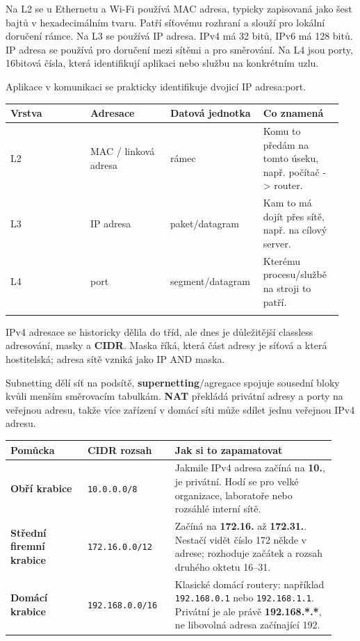 Na L2 se u Ethernetu a Wi-Fi používá MAC adresa, typicky zapisovaná jako šest bajtů v hexadecimálním tvaru. Patří síťovému rozhraní a slouží pro lokální doručení rámce. Na L3 se používá IP adresa. IPv4 má 32 bitů, IPv6 má 128 bitů. IP adresa se používá pro doručení mezi sítěmi a pro směrování. Na L4 jsou porty, 16bitová čísla, která identifikují aplikaci nebo službu na konkrétním uzlu.

Aplikace v komunikaci se prakticky identifikuje dvojicí IP adresa:port.

\begin{longtable}{p{0.237\linewidth}p{0.237\linewidth}p{0.237\linewidth}p{0.237\linewidth}}
\toprule
\textbf{Vrstva} & \textbf{Adresace} & \textbf{Datová jednotka} & \textbf{Co znamená} \\
\midrule\endhead
L2 & MAC / linková adresa & rámec & Komu to předám na tomto úseku, např. počítač -> router. \\
\addlinespace
L3 & IP adresa & paket/datagram & Kam to má dojít přes sítě, např. na cílový server. \\
\addlinespace
L4 & port & segment/datagram & Kterému procesu/službě na stroji to patří. \\
\addlinespace
\bottomrule
\end{longtable}

IPv4 adresace se historicky dělila do tříd, ale dnes je důležitější classless adresování, masky a \textbf{CIDR}. Maska říká, která část adresy je síťová a která hostitelská; adresa sítě vzniká jako IP AND maska.

Subnetting dělí síť na podsítě, \textbf{supernetting}/agregace spojuje sousední bloky kvůli menším směrovacím tabulkám. \textbf{NAT} překládá privátní adresy a porty na veřejnou adresu, takže více zařízení v domácí síti může sdílet jednu veřejnou IPv4 adresu.


\begin{longtable}{p{0.22\linewidth}p{0.25\linewidth}p{0.46\linewidth}}
\toprule
\textbf{Pomůcka} & \textbf{CIDR rozsah} & \textbf{Jak si to zapamatovat} \\
\midrule\endhead
\textbf{Obří krabice} & \texttt{10.0.0.0/8} & Jakmile IPv4 adresa začíná na \textbf{10.}, je privátní. Hodí se pro velké organizace, laboratoře nebo rozsáhlé interní sítě. \\
\addlinespace
\textbf{Střední firemní krabice} & \texttt{172.16.0.0/12} & Začíná na \textbf{172.16.} až \textbf{172.31.}. Nestačí vidět číslo 172 někde v adrese; rozhoduje začátek a rozsah druhého oktetu 16--31. \\
\addlinespace
\textbf{Domácí krabice} & \texttt{192.168.0.0/16} & Klasické domácí routery: například \texttt{192.168.0.1} nebo \texttt{192.168.1.1}. Privátní je ale právě \textbf{192.168.*.*}, ne libovolná adresa začínající 192. \\
\bottomrule
\end{longtable}

